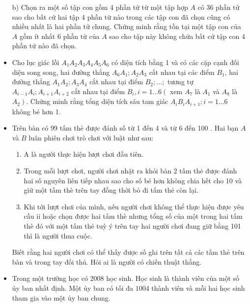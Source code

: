 \documentclass[11pt]{scrartcl}
\begin{document}
\begin{itemize}[label=, leftmargin=0em, itemsep=-0em]
\begin{btvn}
        b) Chọn ra một số tập con gồm 4 phần tử từ một tập hợp $A$ có 36 phần tử sao cho bất cứ hai tập 4 phần từ nào trong các tập con đã chọn cũng có nhiều nhất là hai phần tử chung. Chứng minh rằng tồn tại một tập con của $A$ gồm ít nhất 6 phần từ của $A$ sao cho tập này không chứa bất cứ tập con 4 phần tử nào đã chọn.
    \end{btvn}
    \item \begin{btvn}
        Cho lục giác lồi $A_1 A_2 A_3 A_4 A_5 A_6$ có diện tích bằng 1 và có các cặp cạnh đối diện song song, hai đường thẳng $A_6 A_1 ; A_2 A_3$ cắt nhau tại các điểm $B_1$, hai đường thẳng $A_1 A_2 ; A_3 A_4$ cắt nhau tại điểm $B_2 ; \ldots ;$ tương tự $A_{i-1} A_i ; A_{i+1} A_{i+2}$ cắt nhau tại điểm $B_i, i=1 \ldots 6\left(\right.$ xem $A_7$ là $A_1$ và $A_8$ là $\left.A_2\right)$. Chứng minh rằng tổng diện tích sáu tam giác $A_i B_i A_{i+1} ; i=1 \ldots 6$ không bé hơn 1.
    \end{btvn}
    \item \begin{btvn}
        Trên bàn có 99 tấm thẻ được đánh số từ 1 đến 4 và từ 6 đến 100 . Hai bạn $A$ và $B$ luân phiên chơi trò chơi với luật như sau:
        \begin{enumerate}
            \item A là người thực hiện lượt chơi đầu tiên.
            \item Trong mỗi lượt chơi, người chơi nhặt ra khỏi bàn 2 tấm thė được đánh hai số nguyên liên tiếp nhau sao cho số bé hơn không chia hết cho 10 và giữ một tấm thè trên tay đồng thời bỏ đi tấm thẻ còn lại.
            \item Khi tới lượt chơi của mình, nếu người chơi không thể thực hiện được yêu cầu ii hoặc chọn được hai tấm thè nhưng tổng số của một trong hai tấm thè đó với một tấm thẻ tuỳ ý trên tay hai người chơi đang giữ bằng 101 thì là người thua cuộc.
        \end{enumerate}
        Biết rằng hai người chơi có thể thấy được số ghi trên tất cả các tấm thẻ trên bàn và trong tay đối thủ. Hỏi ai là người có chiến thuật thắng.
    \end{btvn}
    \item \begin{btvn}
        Trong một trường học có $2008$ học sinh. Học sinh là thành viên của một số ủy ban nhất định. Một ủy ban có tối đa $1004$ thành viên và mỗi hai học sinh tham gia vào một ủy ban chung.

\end{btvn}
\end{itemize}
\end{document}
